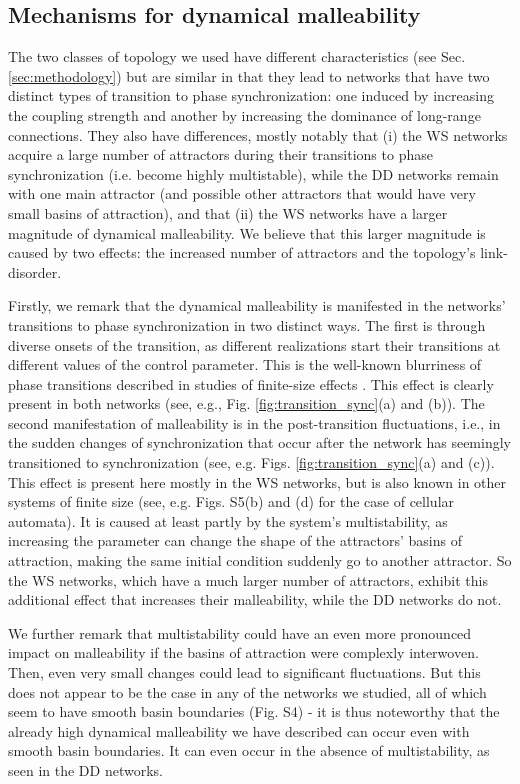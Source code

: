 \subsection*{Mechanisms for dynamical malleability}
The two classes of topology we used have different characteristics (see Sec. \ref{sec:methodology}) but are similar in that they lead to networks that have two distinct types of transition to phase synchronization: one induced by increasing the coupling strength and another by increasing the dominance of long-range connections. They also have differences, mostly notably that (i) the WS networks acquire a large number of attractors during their transitions to phase synchronization (i.e. become highly multistable), while the DD networks remain with one main attractor (and possible other attractors that would have very small basins of attraction), and that (ii) the WS networks have a larger magnitude of dynamical malleability. We believe that this larger magnitude is caused by two effects: the increased number of attractors and the topology's link-disorder.

Firstly, we remark that the dynamical malleability is manifested in the networks' transitions to phase synchronization in two distinct ways. The first is through diverse onsets of the transition, as different realizations start their transitions at different values of the control parameter. This is the well-known blurriness of phase transitions described in studies of finite-size effects \cite{brankov2000theory, binder1987finite}. This effect is clearly present in both networks (see, e.g., Fig. \ref{fig:transition_sync}(a) and (b)). The second manifestation of malleability is in the post-transition fluctuations, i.e., in the sudden changes of synchronization that occur after the network has seemingly transitioned to synchronization (see, e.g. Figs. \ref{fig:transition_sync}(a) and (c)). This effect is present here mostly in the WS networks, but is also known in other systems of finite size (see, e.g. Figs. S5(b) and (d) for the case of cellular automata). It is caused at least partly by the system's multistability, as increasing the parameter can change the shape of the attractors' basins of attraction, making the same initial condition suddenly go to another attractor. So the WS networks, which have a much larger number of attractors, exhibit this additional effect that increases their malleability, while the DD networks do not.

We further remark that multistability could have an even more pronounced impact on malleability if the basins of attraction were complexly interwoven. Then, even very small changes could lead to significant fluctuations. But this does not appear to be the case in any of the networks we studied, all of which seem to have smooth basin boundaries (Fig. S4) - it is thus noteworthy that the already high dynamical malleability we have described can occur even with smooth basin boundaries. It can even occur in the absence of multistability, as seen in the DD networks.

